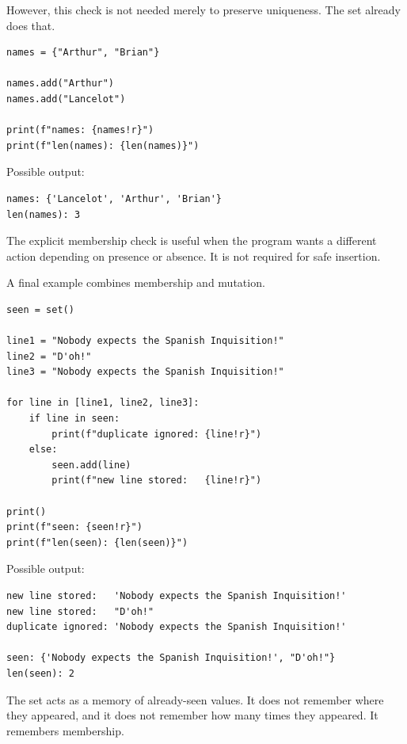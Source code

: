 However, this check is not needed merely to preserve uniqueness. The set already does that.

\begin{verbatim}
names = {"Arthur", "Brian"}

names.add("Arthur")
names.add("Lancelot")

print(f"names: {names!r}")
print(f"len(names): {len(names)}")
\end{verbatim}

Possible output:

\begin{verbatim}
names: {'Lancelot', 'Arthur', 'Brian'}
len(names): 3
\end{verbatim}

The explicit membership check is useful when the program wants a different action depending on presence or absence. It is not required for safe insertion.

A final example combines membership and mutation.

\begin{verbatim}
seen = set()

line1 = "Nobody expects the Spanish Inquisition!"
line2 = "D'oh!"
line3 = "Nobody expects the Spanish Inquisition!"

for line in [line1, line2, line3]:
    if line in seen:
        print(f"duplicate ignored: {line!r}")
    else:
        seen.add(line)
        print(f"new line stored:   {line!r}")

print()
print(f"seen: {seen!r}")
print(f"len(seen): {len(seen)}")
\end{verbatim}

Possible output:

\begin{verbatim}
new line stored:   'Nobody expects the Spanish Inquisition!'
new line stored:   "D'oh!"
duplicate ignored: 'Nobody expects the Spanish Inquisition!'

seen: {'Nobody expects the Spanish Inquisition!', "D'oh!"}
len(seen): 2
\end{verbatim}

The set acts as a memory of already-seen values. It does not remember where they appeared, and it does not remember how many times they appeared. It remembers membership.